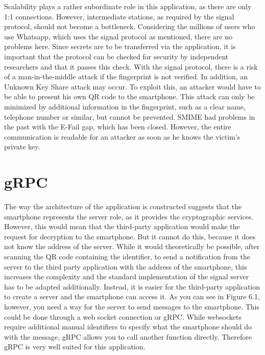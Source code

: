 \documentclass[12pt,oneside,a4paper,parskip]{scrbook}
\begin{document}
Scalability plays a rather subordinate role in this application, as there are only 1:1 connections. However, intermediate stations, as required by the signal protocol, should not become a bottleneck. Considering the millions of users who use Whatsapp, which uses the signal protocol as mentioned, there are no problems here.
Since secrets are to be transferred via the application, it is important that the protocol can be checked for security by independent researchers and that it passes this check.
With the signal protocol, there is a risk of a man-in-the-middle attack if the fingerprint is not verified. In addition, an Unknown Key Share attack may occur. To exploit this, an attacker would have to be able to present his own QR code to the smartphone. This attack can only be minimized by additional information in the fingerprint, such as a clear name, telephone number or similar, but cannot be prevented. SMIME had problems in the past with the E-Fail gap, which has been closed. However, the entire communication is readable for an attacker as soon as he knows the victim's private key.



\section{gRPC}
The way the architecture of the application is constructed suggests that the smartphone represents the server role, as it provides the cryptographic services. However, this would mean that the third-party application would make the request for decryption to the smartphone. But it cannot do this, because it does not know the address of the server. While it would theoretically be possible, after scanning the QR code containing the identifier, to send a notification from the server to the third party application with the address of the smartphone, this increases the complexity and the standard implementation of the signal server has to be adapted additionally. Instead, it is easier for the third-party application to create a server and the smartphone can access it. As you can see in Figure 6.1, however, you need a way for the server to send messages to the smartphone. This could be done through a web socket connection or gRPC. While websockets require additional manual identifiers to specify what the smartphone should do with the message, gRPC allows you to call another function directly. Therefore gRPC is very well suited for this application.
\end{document}

